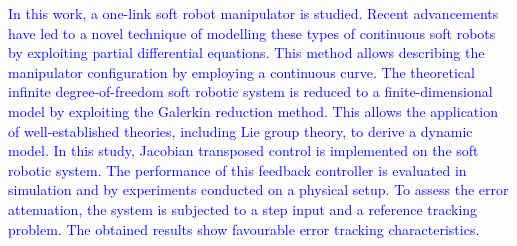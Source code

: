 \textcolor{blue}{In this work, a one-link soft robot manipulator is studied. Recent advancements have led to a novel technique of modelling these types of continuous soft robots by exploiting partial differential equations. This method allows describing the manipulator configuration by employing a continuous curve. The theoretical infinite degree-of-freedom soft robotic system is reduced to a finite-dimensional model by exploiting the Galerkin reduction method. This allows the application of well-established theories, including Lie group theory, to derive a dynamic model. In this study, Jacobian transposed control is implemented on the soft robotic system. The performance of this feedback controller is evaluated in simulation and by experiments conducted on a physical setup. To assess the error attenuation, the system is subjected to a step input and a reference tracking problem. The obtained results show favourable error tracking characteristics.}

